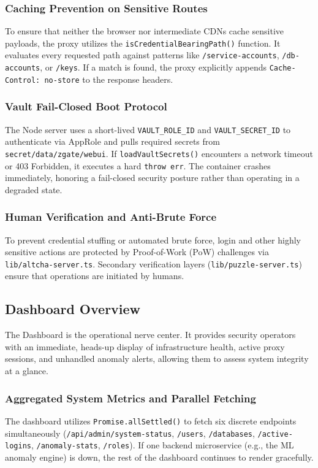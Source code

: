 \subsubsection{Caching Prevention on Sensitive Routes}
To ensure that neither the browser nor intermediate CDNs cache sensitive payloads, the proxy utilizes the \texttt{isCredentialBearingPath()} function. It evaluates every requested path against patterns like \texttt{/service-accounts}, \texttt{/db-accounts}, or \texttt{/keys}. If a match is found, the proxy explicitly appends \texttt{Cache-Control: no-store} to the response headers.

\subsubsection{Vault Fail-Closed Boot Protocol}
The Node server uses a short-lived \texttt{VAULT\_ROLE\_ID} and \texttt{VAULT\_SECRET\_ID} to authenticate via AppRole and pulls required secrets from \texttt{secret/data/zgate/webui}. If \texttt{loadVaultSecrets()} encounters a network timeout or 403 Forbidden, it executes a hard \texttt{throw err}. The container crashes immediately, honoring a fail-closed security posture rather than operating in a degraded state.

\subsubsection{Human Verification and Anti-Brute Force}
To prevent credential stuffing or automated brute force, login and other highly sensitive actions are protected by Proof-of-Work (PoW) challenges via \texttt{lib/altcha-server.ts}. Secondary verification layers (\texttt{lib/puzzle-server.ts}) ensure that operations are initiated by humans.

\subsection{Dashboard Overview}
The Dashboard is the operational nerve center. It provides security operators with an immediate, heads-up display of infrastructure health, active proxy sessions, and unhandled anomaly alerts, allowing them to assess system integrity at a glance.

\subsubsection{Aggregated System Metrics and Parallel Fetching}
The dashboard utilizes \texttt{Promise.allSettled()} to fetch six discrete endpoints simultaneously (\texttt{/api/admin/system-status}, \texttt{/users}, \texttt{/databases}, \texttt{/active-logins}, \texttt{/anomaly-stats}, \texttt{/roles}). If one backend microservice (e.g., the ML anomaly engine) is down, the rest of the dashboard continues to render gracefully.

